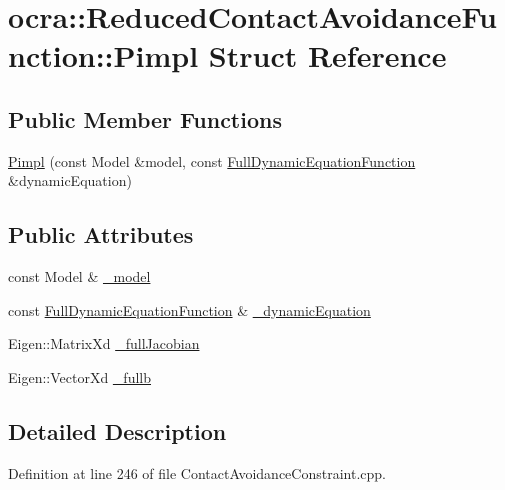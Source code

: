 \hypertarget{structReducedContactAvoidanceFunction_1_1Pimpl}{}\section{ocra\+:\+:Reduced\+Contact\+Avoidance\+Function\+:\+:Pimpl Struct Reference}
\label{structReducedContactAvoidanceFunction_1_1Pimpl}
\subsection*{Public Member Functions}
\begin{DoxyCompactItemize}
\item 
\hyperlink{structReducedContactAvoidanceFunction_1_1Pimpl_ab7258766eea3fd037b4e59e381adfdd5}{Pimpl} (const Model \&model, const \hyperlink{classocra_1_1FullDynamicEquationFunction}{Full\+Dynamic\+Equation\+Function} \&dynamic\+Equation)
\end{DoxyCompactItemize}
\subsection*{Public Attributes}
\begin{DoxyCompactItemize}
\item 
const Model \& \hyperlink{structReducedContactAvoidanceFunction_1_1Pimpl_acd2bf5f47839d39cb37ac323e038558f}{\+\_\+model}
\item 
const \hyperlink{classocra_1_1FullDynamicEquationFunction}{Full\+Dynamic\+Equation\+Function} \& \hyperlink{structReducedContactAvoidanceFunction_1_1Pimpl_a2993139449f5c29b4a85a9e3c261834c}{\+\_\+dynamic\+Equation}
\item 
Eigen\+::\+Matrix\+Xd \hyperlink{structReducedContactAvoidanceFunction_1_1Pimpl_a6ddc277e90776add368eee6a56494f45}{\+\_\+full\+Jacobian}
\item 
Eigen\+::\+Vector\+Xd \hyperlink{structReducedContactAvoidanceFunction_1_1Pimpl_ade6d248f540e91b5b9cfe961981d03a3}{\+\_\+fullb}
\end{DoxyCompactItemize}


\subsection{Detailed Description}


Definition at line 246 of file Contact\+Avoidance\+Constraint.\+cpp.



